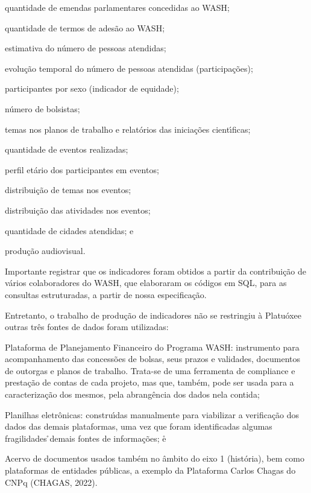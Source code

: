 \documentclass[
12pt,		%
openright,	%
twoside,  %
a4paper,			%
chapter=TITLE,		%
english,			%
french,				%
spanish,			%
brazil				%
]{USPSC-classe/USPSC}
\begin{document}
\begin{alineas}
\item quantidade de emendas parlamentares concedidas ao WASH;
\item quantidade de termos de ades\~ao ao WASH;
\item estimativa do n\'umero de pessoas atendidas;
\item evolu\c{c}\~ao temporal do n\'umero de pessoas atendidas (participa\c{c}\~oes);
\item participantes por sexo (indicador de equidade);
\item n\'umero de bolsistas;
\item temas nos planos de trabalho e relat\'orios das inicia\c{c}\~oes cient\'{\i}ficas;
\item quantidade de eventos realizadas;
\item perfil et\'ario dos participantes em eventos;
\item distribui\c{c}\~ao de temas nos eventos;
\item distribui\c{c}\~ao das atividades nos eventos;
\item quantidade de cidades atendidas; e
\item produ\c{c}\~ao audiovisual.
\end{alineas}

Importante registrar que os indicadores foram obtidos a partir da contribui\c{c}\~ao de v\'arios colaboradores do WASH, que elaboraram os c\'odigos em SQL, para as consultas estruturadas, a partir de nossa especifica\c{c}\~ao.









Entretanto, o trabalho de produ\c{c}\~ao de indicadores n\~ao se restringiu \`a \textquotedbl  Platu\'oxe\textquotedbl  e outras tr\^es fontes de dados foram utilizadas:










\begin{alineas}
\item Plataforma de Planejamento Financeiro do Programa WASH: instrumento para acompanhamento das concess\~oes de bolsas, seus prazos e validades, documentos de outorgas e planos de trabalho. Trata-se de uma ferramenta de compliance e presta\c{c}\~ao de contas de cada projeto, mas que, tamb\'em, pode ser usada para a caracteriza\c{c}\~ao dos mesmos, pela abrang\^encia dos dados nela contida;
\item Planilhas eletr\^onicas: constru\'{\i}das  manualmente para viabilizar a verifica\c{c}\~ao dos dados das demais plataformas, uma vez que foram identificadas algumas fragilidades \r\nnas demais fontes de informa\c{c}\~oes; e\r\n
\item Acervo de documentos usados tamb\'em no \^ambito do eixo 1 (hist\'oria), bem como plataformas de entidades p\'ublicas, a exemplo da Plataforma Carlos Chagas do CNPq (CHAGAS, 2022).
\end{alineas}
\end{document}
